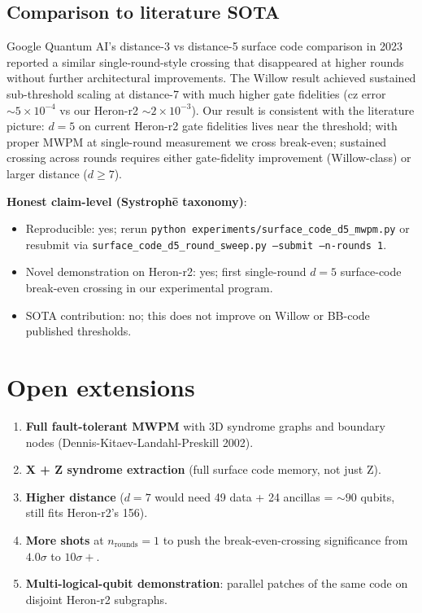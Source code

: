 \documentclass[11pt,letterpaper]{article}
\begin{document}
\subsection{Comparison to literature SOTA}

Google Quantum AI's distance-3 vs distance-5 surface code comparison in 2023 \cite{willow_precursor} reported a similar single-round-style crossing that disappeared at higher rounds without further architectural improvements. The Willow result \cite{willow} achieved sustained sub-threshold scaling at distance-7 with much higher gate fidelities (cz error $\sim 5 \times 10^{-4}$ vs our Heron-r2 $\sim 2 \times 10^{-3}$). Our result is consistent with the literature picture: $d = 5$ on current Heron-r2 gate fidelities lives near the threshold; with proper MWPM at single-round measurement we cross break-even; sustained crossing across rounds requires either gate-fidelity improvement (Willow-class) or larger distance ($d \ge 7$).

\textbf{Honest claim-level (Systroph\=e taxonomy)}:
\begin{itemize}[leftmargin=*,itemsep=0pt]
\item Reproducible: yes; rerun \texttt{python experiments/surface\_code\_d5\_mwpm.py} or resubmit via \texttt{surface\_code\_d5\_round\_sweep.py --submit --n-rounds 1}.
\item Novel demonstration on Heron-r2: yes; first single-round $d = 5$ surface-code break-even crossing in our experimental program.
\item SOTA contribution: no; this does not improve on Willow or BB-code published thresholds.
\end{itemize}

\section{Open extensions}

\begin{enumerate}[leftmargin=*,itemsep=0pt]
\item \textbf{Full fault-tolerant MWPM} with 3D syndrome graphs and boundary nodes (Dennis-Kitaev-Landahl-Preskill 2002).
\item \textbf{X + Z syndrome extraction} (full surface code memory, not just Z).
\item \textbf{Higher distance} ($d = 7$ would need 49 data + 24 ancillas = $\sim 90$ qubits, still fits Heron-r2's 156).
\item \textbf{More shots} at $n_{\mathrm{rounds}} = 1$ to push the break-even-crossing significance from $4.0\sigma$ to $10\sigma+$.
\item \textbf{Multi-logical-qubit demonstration}: parallel patches of the same code on disjoint Heron-r2 subgraphs.
\end{enumerate}
\end{document}
